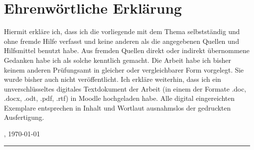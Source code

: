 \section*{Ehrenwörtliche Erklärung}

Hiermit erkläre ich, dass ich die vorliegende  \art\/ mit dem Thema \newline \newline
{\itshape{} \titel\/}\newline \newline
 selbstständig und ohne fremde Hilfe verfasst
und keine anderen als die angegebenen Quellen und Hilfsmittel benutzt habe. Aus fremden Quellen direkt oder
indirekt übernommene Gedanken habe ich als solche kenntlich gemacht. Die Arbeit habe ich bisher keinem
anderen Prüfungsamt in gleicher oder vergleichbarer Form vorgelegt. Sie wurde bisher auch nicht veröffentlicht.
Ich erkläre weiterhin, dass ich ein unverschlüsseltes digitales Textdokument der Arbeit (in einem der Formate
.doc, .docx, .odt, .pdf, .rtf) in Moodle hochgeladen habe. Alle digital eingereichten Exemplare entsprechen in
Inhalt und Wortlaut ausnahmslos der gedruckten Ausfertigung.



\vspace{3em}

\abgabeort, \today
\vspace{4em}

\rule{6cm}{0.4pt}\\
\autor
 

